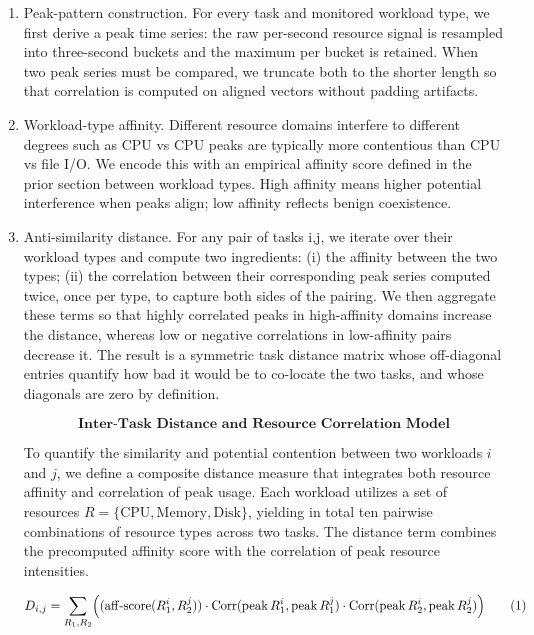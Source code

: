 \begin{enumerate}
    \item Peak-pattern construction. For every task and monitored workload type, we first derive a peak time series: the raw per-second resource signal is resampled into three-second buckets and the maximum per bucket is retained. When two peak series must be compared, we truncate both to the shorter length so that correlation is computed on aligned vectors without padding artifacts.
    \item Workload-type affinity. Different resource domains interfere to different degrees such as CPU vs CPU peaks are typically more contentious than CPU vs file I/O. We encode this with an empirical affinity score defined in the prior section between workload types. High affinity means higher potential interference when peaks align; low affinity reflects benign coexistence.
    \item Anti-similarity distance. For any pair of tasks i,j, we iterate over their workload types and compute two ingredients: (i) the affinity between the two types; (ii) the correlation between their corresponding peak series computed twice, once per type, to capture both sides of the pairing. We then aggregate these terms so that highly correlated peaks in high-affinity domains increase the distance, whereas low or negative correlations in low-affinity pairs decrease it. The result is a symmetric task distance matrix whose off-diagonal entries quantify how bad it would be to co-locate the two tasks, and whose diagonals are zero by definition.

          \[
              \textbf{Inter-Task Distance and Resource Correlation Model}
          \]

          To quantify the similarity and potential contention between two workloads
          \( i \) and \( j \), we define a composite distance measure
          that integrates both resource affinity and correlation of peak usage.
          Each workload utilizes a set of resources
          \( R = \{ \text{CPU}, \text{Memory}, \text{Disk}\} \),
          yielding in total ten pairwise combinations of resource types across two tasks.
          The distance term combines the precomputed affinity score with the
          correlation of peak resource intensities.

          \[
              D_{i,j}
              = \sum_{R_1, R_2}
              \Bigl(
              (\mathrm{aff\text{-}score}(R_1^i, R_2^j))
              \cdot
              \mathrm{Corr}(\mathrm{peak}\,R_1^i, \mathrm{peak}\,R_1^j)
              \cdot
              \mathrm{Corr}(\mathrm{peak}\,R_2^i, \mathrm{peak}\,R_2^j)
              \Bigr)
              \tag{1}
          \]


\end{enumerate}
